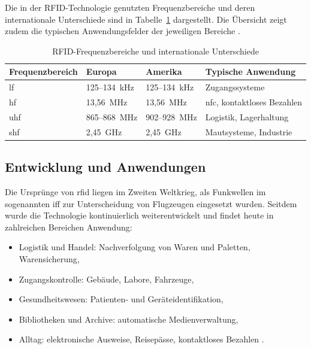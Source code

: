Die in der RFID-Technologie genutzten Frequenzbereiche und deren internationale Unterschiede sind in Tabelle~\ref{tab:TabelleFrequenzbereiche} dargestellt. 
Die Übersicht zeigt zudem die typischen Anwendungsfelder der jeweiligen Bereiche \cite{finkenzeller:2019}.

\begin{table}[H]
	\caption{RFID-Frequenzbereiche und internationale Unterschiede \cite{finkenzeller:2019}}
	\label{tab:TabelleFrequenzbereiche}
	\begin{tabular}{|l|l|l|l|}
		\hline
		\textbf{Frequenzbereich} & \textbf{Europa} & \textbf{Amerika} & \textbf{Typische Anwendung} \\ \hline
		\ac{lf} & 125–134~kHz & 125–134~kHz & Zugangssysteme \\ \hline
		\ac{hf} & 13{,}56~MHz & 13{,}56~MHz & \ac{nfc}, kontaktloses Bezahlen \\ \hline
		\ac{uhf} & 865–868~MHz & 902–928~MHz & Logistik, Lagerhaltung \\ \hline
		\ac{shf} & 2{,}45~GHz & 2{,}45~GHz & Mautsysteme, Industrie \\ \hline
	\end{tabular}
\end{table}










\subsection{Entwicklung und Anwendungen}

Die Ursprünge von \ac{rfid} liegen im Zweiten Weltkrieg, als Funkwellen im sogenannten \ac{iff} zur Unterscheidung von Flugzeugen eingesetzt wurden. 
Seitdem wurde die Technologie kontinuierlich weiterentwickelt und findet heute in zahlreichen Bereichen Anwendung: 

\begin{itemize}
	\item Logistik und Handel: Nachverfolgung von Waren und Paletten, Warensicherung, 
	\item Zugangskontrolle: Gebäude, Labore, Fahrzeuge, 
	\item Gesundheitswesen: Patienten- und Geräteidentifikation, 
	\item Bibliotheken und Archive: automatische Medienverwaltung, 
	\item Alltag: elektronische Ausweise, Reisepässe, kontaktloses Bezahlen \cite{Rieback:2006,Liu:2024}. 
\end{itemize}

